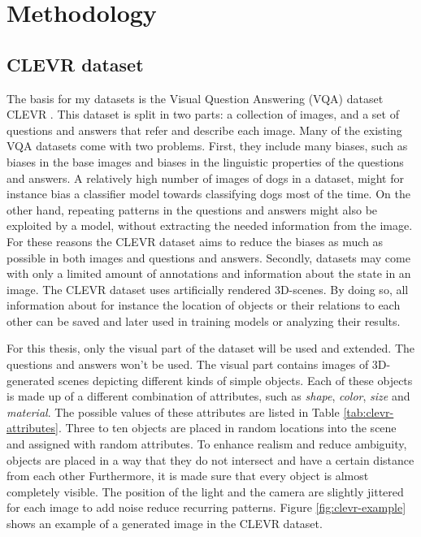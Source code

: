 \section{Methodology}
\label{sec:methodology}

\subsection{CLEVR dataset}
The basis for my datasets is the Visual Question Answering (VQA) dataset CLEVR \citep{Johnson2017a}.
This dataset is split in two parts: a collection of images, and a set of questions and answers that refer and describe each image.
Many of the existing VQA datasets come with two problems.
First, they include many biases, such as biases in the base images and biases in the linguistic properties of the questions and answers.
A relatively high number of images of dogs in a dataset, might for instance bias a classifier model towards classifying dogs most of the time.
On the other hand, repeating patterns in the questions and answers might also be exploited by a model, without extracting the needed information from the image.
For these reasons the CLEVR dataset aims to reduce the biases as much as possible in both images and questions and answers.
Secondly, datasets may come with only a limited amount of annotations and information about the state in an image.
The CLEVR dataset uses artificially rendered 3D-scenes.
By doing so, all information about for instance the location of objects or their relations to each other can be saved and later used in training models or analyzing their results.

For this thesis, only the visual part of the dataset will be used and extended.
The questions and answers won't be used.
The visual part contains images of 3D-generated scenes depicting different kinds of simple objects.
Each of these objects is made up of a different combination of attributes, such as \emph{shape}, \emph{color}, \emph{size} and \emph{material}.
The possible values of these attributes are listed in Table \ref{tab:clevr-attributes}.
Three to ten objects are placed in random locations into the scene and assigned with random attributes.
To enhance realism and reduce ambiguity, objects are placed in a way that they do not intersect and have a certain distance from each other
Furthermore, it is made sure that every object is almost completely visible.
The position of the light and the camera are slightly jittered for each image to add noise reduce recurring patterns.
Figure \ref{fig:clevr-example} shows an example of a generated image in the CLEVR dataset.

